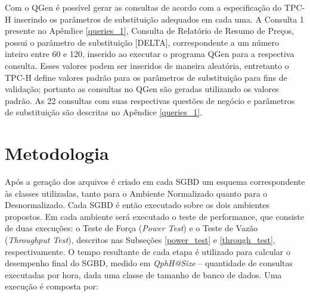 Com o QGen é possível gerar as consultas de acordo com a especificação do TPC-H inserindo os parâmetros de substituição adequados em cada uma. A Consulta 1 presente no Apêndice \ref{queries_1}, Consulta de Relatório de Resumo de Preços, possui o parâmetro de substituição [DELTA], correspondente a um número inteiro entre 60 e 120, inserido ao executar o programa QGen para a respectiva consulta. Esses valores podem ser inseridos de maneira aleatória, entretanto o TPC-H define valores padrão para os parâmetros de substituição para fins de validação; portanto as consultas no QGen são geradas utilizando os valores padrão. As 22 consultas com suas respectivas questões de negócio e parâmetros de substituição são descritas no Apêndice \ref{queries_1}.

\section{Metodologia}
\label{metodologia}

Após a geração dos arquivos é criado em cada SGBD um esquema correspondente às classes utilizadas, tanto para o Ambiente Normalizado quanto para o Desnormalizado. Cada SGBD é então executado sobre os dois ambientes propostos. Em cada ambiente será executado o teste de performance, que consiste de duas execuções: o Teste de Força (\textit{Power Test}) e o Teste de Vazão (\textit{Throughput Test}), descritos nas Subseções \ref{power_test} e \ref{through_test}, respectivamente. O tempo resultante de cada etapa é utilizado para calcular o desempenho final do SGBD, medido em \textit{QphH@Size} -- quantidade de consultas executadas por hora, dada uma classe de tamanho de banco de dados. Uma execução é composta por:

